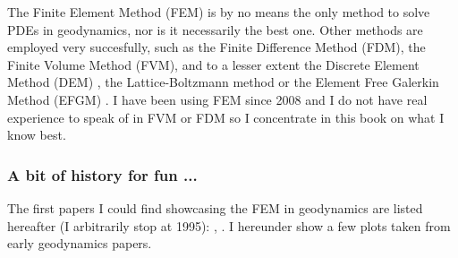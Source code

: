 The Finite Element Method (FEM) is by no means the only method 
to solve PDEs in geodynamics, nor is it necessarily the best one.
Other methods are employed very succesfully, such as the Finite Difference 
Method (FDM), the Finite Volume Method (FVM), and to a lesser extent
the Discrete Element Method (DEM) \cite{tasy05,egho07,egsc07,funi14}, 
the Lattice-Boltzmann method \cite{hupc08} 
or the Element Free Galerkin Method (EFGM) \cite{hans03}.
I have been using FEM since 2008 and I do not have real 
experience to speak of in FVM or FDM so I concentrate in this book 
on what I know best. 

\subsubsection{A bit of history for fun ... }

The first papers I could find showcasing the FEM in geodynamics are listed hereafter
(I arbitrarily stop at 1995):
\cite{gart78}, 
\cite{anbr80}\cite{mera80}
\cite{engl82}
\cite{thar85}
\cite{enho86}\cite{mofr86}
\cite{zupa86}
\cite{boww89}
\cite{brau94}
\cite{brbe95}.
I hereunder show a few plots taken from early geodynamics papers.


